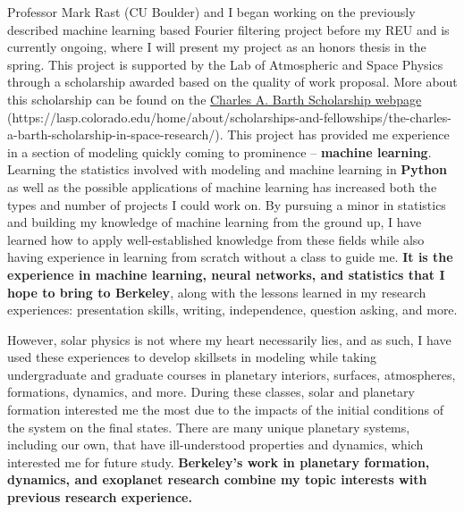 \documentclass[11pt,letterpaper]{article}
\begin{document}
Professor Mark Rast (CU Boulder) and I began working on the previously described machine learning based Fourier filtering project before my REU and is currently ongoing, where I will present my project as an honors thesis in the spring. This project is supported by the Lab of Atmospheric and Space Physics through a scholarship awarded based on the quality of work proposal. More about this scholarship can be found on the \href{https://lasp.colorado.edu/home/about/scholarships-and-fellowships/the-charles-a-barth-scholarship-in-space-research/}{Charles A. Barth Scholarship webpage} (https://lasp.colorado.edu/home/about/scholarships-and-fellowships/the-charles-a-barth-scholarship-in-space-research/). This project has provided me experience in a section of modeling quickly coming to prominence -- \textbf{machine learning}. Learning the statistics involved with modeling and machine learning in \textbf{Python} as well as the possible applications of machine learning has increased both the types and number of projects I could work on. By pursuing a minor in statistics and building my knowledge of machine learning from the ground up, I have learned how to apply well-established knowledge from these fields while also having experience in learning from scratch without a class to guide me. \textbf{It is the experience in machine learning, neural networks, and statistics that I hope to bring to Berkeley}, along with the lessons learned in my research experiences: presentation skills, writing, independence, question asking, and more.

However, solar physics is not where my heart necessarily lies, and as such, I have used these experiences to develop skillsets in modeling while taking undergraduate and graduate courses in planetary interiors, surfaces, atmospheres, formations, dynamics, and more. During these classes, solar and planetary formation interested me the most due to the impacts of the initial conditions of the system on the final states. There are many unique planetary systems, including our own, that have ill-understood properties and dynamics, which interested me for future study. \textbf{Berkeley's work in planetary formation, dynamics, and exoplanet research combine my topic interests with previous research experience.}
\end{document}
